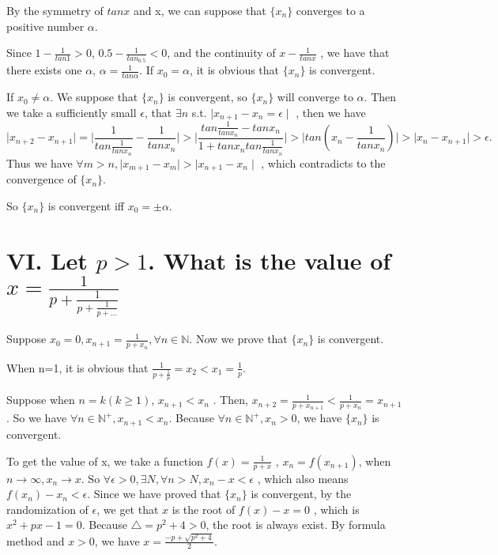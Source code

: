\documentclass[twoside,a4paper]{article}
\begin{document}
By the symmetry of $tanx$ and x, we can suppose that  $\{x_{n}\}$ 
converges to a positive number $\alpha$.

Since  $1-\frac{1}{tan1}>0$, $0.5-\frac{1}{tan_0.5}<0$, and the continuity of $x-\frac{1}{tanx}$
, we have that there exists one $\alpha$,  $\alpha=\frac{1}{tan\alpha}$.
If $x_{0}=\alpha$, it is obvious that $\{x_{n}\}$ is convergent.

If $x_{0}\neq \alpha$.
We suppose that $\{x_{n}\}$ is convergent, so $\{x_{n}\}$ will converge to $\alpha$.
Then we take a sufficiently small $\epsilon$, that  $\exists n$ s.t. $ \mid x_{n+1}-x_{n}=\epsilon \mid $
, then we have 
\[
 \mid x_{n+2}-x_{n+1} \mid =  \mid \frac{1}{tan\frac{1}{tanx_{n}}}-\frac{1}{tanx_{n}} \mid 
 > \mid \frac{tan\frac{1}{tanx_{n}}-tanx_{n}}{1+tanx_{n}tan\frac{1}{tanx_{n}}} \mid
 > \mid tan\left(  x_{n}-\frac{1}{tanx_{n}}\right)  \mid
 > \mid x_{n}-x_{n+1} \mid>\epsilon
.\] 
Thus we have $\forall m>n,  \mid  x_{m+1}-x_{m}\mid> \mid  x_{n+1}-x_{n}\mid  $ 
, which contradicts to the convergence of $\{x_{n}\}$.

So $\{x_{n}\}$ is convergent iff $x_{0}=\pm\alpha$.

\section*{VI. \small{Let $p>1$. What is the value 
of $x=\frac{1}{p+\frac{1}{p+\frac{1}{p+\ldots}}}$}}

Suppose $x_0=0, x_{n+1}=\frac{1}{p+x_{n}}, \forall n\in\mathbb{N}$.
Now we prove that $\{x_{n}\}$ is convergent.

When n=1, it is obvious that $\frac{1}{p+\frac{1}{p}}=x_2<x_1=\frac{1}{p}$.

Suppose when $n=k\left(  k\ge 1\right) $, $x_{n+1}<x_{n}$
. Then, $x_{n+2}=\frac{1}{p+x_{n+1}}<\frac{1}{p+x_{n}}=x_{n+1}$.
So we have $\forall n\in \mathbb{N}^{+}, x_{n+1}<x_{n}$.
Because $\forall n\in\mathbb{N}^{+}, x_{n}>0$, we have $\{x_{n}\}$ is convergent.

To get the value of x, we take a function $f\left( x\right)=\frac{1}{p+x} $
, $x_{n}=f\left( x_{n+1} \right) $, when $n\to \infty, x_{n}\to x$.
So $\forall \epsilon>0, \exists N, \forall n>N, x_{n}-x<\epsilon$
, which also means $f\left( x_{n}\right)-x_{n}<\epsilon$.
Since we have proved that $\{x_{n}\}$ is convergent, by the randomization of $\epsilon$, we get that  $x$ is the root of  $f\left(  x\right)-x=0$
, which is $x^2+px-1=0$. Because $\bigtriangleup=p^2+4>0$, the root is always exist. By formula method and $x>0$, we have $x=\frac{-p+\sqrt{p^2+4} }{2}$.
\end{document}
